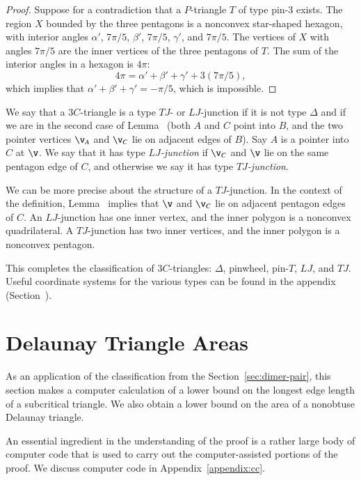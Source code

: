 \begin{proof} 
  Suppose for a contradiction that a $P$-triangle $T$ of type pin-$3$
  exists.  The region $X$ bounded by the three pentagons is a
  nonconvex star-shaped hexagon, with interior angles $\alpha'$,
  $7\pi/5$, $\beta'$, $7\pi/5$, $\gamma'$, and $7\pi/5$.  The vertices
  of $X$ with angles $7\pi/5$ are the inner vertices of the three
  pentagons of $T$.  The sum of the interior angles in a hexagon is
  $4\pi$:
\[
4\pi = \alpha'+\beta'+\gamma' + 3 (7\pi/5),
\]
which implies that $\alpha'+\beta'+\gamma' = -\pi/5$, which is
impossible.
\end{proof}

\begin{definition}
  We say that a $3C$-triangle is a type $TJ$- or $LJ$-junction if it
  is not type $\Delta$ and if we are in the second case of
  Lemma~ (both $A$ and $C$ point into $B$, and the two
  pointer vertices $\v_A$ and $\v_C$ lie on adjacent edges of $B$).
  Say $A$ is a pointer into $C$ at $\v$.  We say that it has type {\it
    $LJ$-junction} if $\v_C$ and $\v$ lie on the same pentagon edge of
  $C$, and otherwise we say it has type {\it $TJ$-junction}.
\end{definition}

We can be more precise about the structure of a $TJ$-junction.  In the
context of the definition, Lemma~ implies that $\v$
and $\v_C$ lie on adjacent pentagon edges of $C$.  An $LJ$-junction
has one inner vertex, and the inner polygon is a nonconvex quadrilateral.
A $TJ$-junction has two inner vertices, and the inner polygon is a
nonconvex pentagon.

This completes the classification of $3C$-triangles: $\Delta$,
pinwheel, pin-$T$, $LJ$, and $TJ$.  Useful coordinate systems for the
various types can be found in the appendix
(Section~).

\section{Delaunay Triangle Areas}

As an application of the classification from the Section~\ref{sec:dimer-pair},
this section makes a computer calculation of a lower bound on the
longest edge length of a subcritical triangle.  We also obtain a lower
bound on the area of a nonobtuse Delaunay triangle.

An essential ingredient in the understanding of the proof is a
rather large body of computer code that is used to carry out the
computer-assisted portions of the proof.  We discuss
computer code in Appendix~\ref{appendix:cc}.


